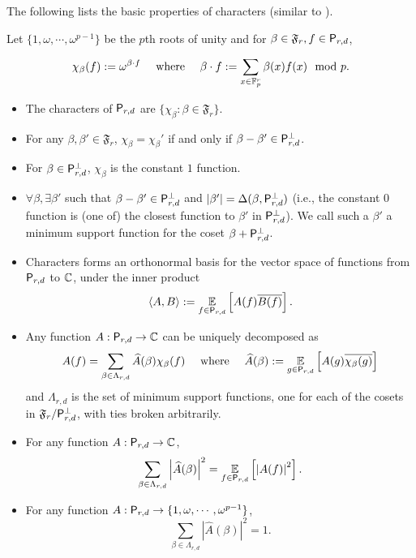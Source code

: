The following lists the basic properties of characters 
(similar to ).  
 
\begin{observation}
\label{lem:fourier-poly} 
Let $\{1,\omega,\cdots,\omega^{p-1}\}$ be the $p$th roots of
unity and for $\beta \in \mathfrak F_r, f \in \mathsf P_{r,d}$,

 $$\chi_\beta(f) := \omega^{ \beta \cdot f } ~~~~\text{where}
 ~~~~ \beta \cdot f := \sum_{x \in \mathbb F_p^r} \beta(x) f(x) \mod p.$$ 
 
\begin{itemize} \item The characters of
$\mathsf P_{r,d}$ are $\{ \chi_\beta : \beta \in \mathfrak F_r\}$. \item For any
$\beta,\beta' \in \mathfrak F_r$, $\chi_\beta = \chi_\beta'$ if and only if
$\beta-\beta' \in \mathsf P_{r,d}^\perp$. 
\item For $\beta \in \mathsf P_{r,d}^\perp$,
$\chi_\beta$ is the constant $1$ function. 
\item\label{item:minsup} $\forall
\beta, \exists \beta'$ such that $\beta-\beta' \in \mathsf P_{r,d}^\perp$ and
$|\beta'| = \Delta(\beta, \mathsf P_{r,d}^\perp)$ (i.e., the constant $0$
function is (one of) the closest function to $\beta'$ in $\mathsf P_{r,d}^\perp$). We
call such a $\beta'$ a minimum support function for the coset $\beta +
\mathsf P_{r,d}^\perp$.  
\item Characters forms an orthonormal basis for the vector
space of functions from $\mathsf P_{r,d}$ to $\mathbb C$, under the inner product 
$$\langle A,
B\rangle := \operatorname*{\mathbb E}_{f \in \mathsf P_{r,d}} \left[A(f)\overline{B(f)}\right].$$ 

\item Any function $A:\mathsf P_{r,d} \rightarrow \mathbb C$ can be uniquely decomposed as 
$$A(f) =\sum_{\beta \in \Lambda_{r,d}}\widehat{A}(\beta) \chi_\beta(f) 
~~~~ \text{where} ~~~~ \widehat{A}(\beta) := \operatorname*{\mathbb E}_{g \in \mathsf P_{r,d}} \left[A(g)
\overline{\chi_\beta(g)}\right]$$
 and $\Lambda_{r,d}$ is the set of minimum
support functions, one for each of the cosets in $\mathfrak
F_r/\mathsf P_{r,d}^\perp$, with ties broken arbitrarily. 
\item For any function $A:\mathsf P_{r,d} \rightarrow\mathbb C$, 
$$\sum_{\beta \in \Lambda_{r,d}} \left|\widehat A(\beta)\right|^2 = \operatorname*{\mathbb E}_{f\in \mathsf P_{r,d}}
\left[\left|A(f)\right|^2\right].$$ 
\item For any function $A:\mathsf P_{r,d}\rightarrow\{1,\omega,\cdots,\omega^{p-1}\}$, 
$$\sum_{\beta\in \Lambda_{r,d}}|\widehat A(\beta)|^2 =1.$$ 
\end{itemize} 
\end{observation} 
